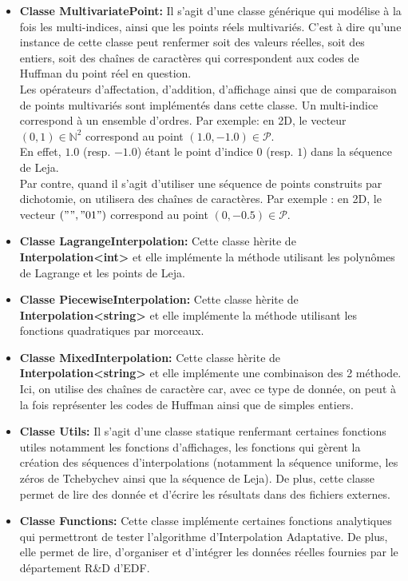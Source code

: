 \begin{itemize}
\item \textbf{Classe MultivariatePoint:} Il s'agit d'une classe générique qui modélise à la fois les multi-indices, ainsi que les points réels multivariés. C'est à dire qu'une instance de cette classe peut renfermer soit des valeurs réelles, soit des entiers, soit des chaînes de caractères qui correspondent aux codes de Huffman du point réel en question.\\
Les opérateurs d'affectation, d'addition, d'affichage ainsi que de comparaison de points multivariés sont implémentés dans cette classe. Un multi-indice correspond à un ensemble d'ordres. Par exemple: en 2D, le vecteur $(0,1) \in \mathbb{N}^2$ correspond au point $(1.0,-1.0) \in \mathcal{P}$. \\
En effet, $1.0$ (resp. $-1.0$) étant le point d'indice $0$ (resp. $1$) dans la séquence de Leja.\\
Par contre, quand il s'agit d'utiliser une séquence de points construits par dichotomie, on utilisera des chaînes de  caractères. Par exemple : en 2D, le vecteur $("","01")$ correspond au point $(0,-0.5) \in \mathcal{P}$.\\

\item \textbf{Classe LagrangeInterpolation:} Cette classe hèrite de \textbf{Interpolation<int>} et elle implémente la méthode utilisant les polynômes de Lagrange et les points de Leja.

\item \textbf{Classe PiecewiseInterpolation:} Cette classe hèrite de \textbf{Interpolation<string>} et elle implémente la méthode utilisant les fonctions quadratiques par morceaux.

\item \textbf{Classe MixedInterpolation:} Cette classe hèrite de \textbf{Interpolation<string>} et elle implémente une combinaison des 2 méthode. Ici, on utilise des chaînes de caractère car, avec ce type de donnée, on peut à la fois représenter les codes de Huffman ainsi que de simples entiers.

\item \textbf{Classe Utils:} Il s'agit d'une classe statique renfermant certaines fonctions utiles notamment les fonctions d'affichages, les fonctions qui gèrent la création des séquences d'interpolations (notamment la séquence uniforme, les zéros de Tchebychev ainsi que la séquence de Leja). De plus, cette classe permet de lire des donnée et d'écrire les résultats dans des fichiers externes.

\item \textbf{Classe Functions:}
Cette classe implémente certaines fonctions analytiques qui permettront de tester l'algorithme d'Interpolation  Adaptative. De plus, elle permet de lire, d'organiser et d'intégrer les données réelles fournies par le département R\&D d'EDF.
\end{itemize}

